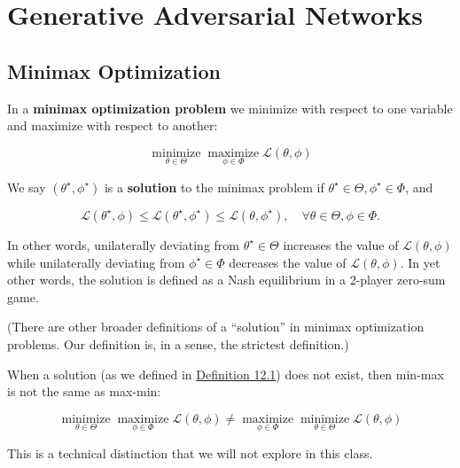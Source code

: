 \chapter{Generative Adversarial Networks}

\section{Minimax Optimization}

\begin{definition}
    In a \textbf{minimax optimization problem} we minimize with respect to one variable and maximize with respect to another:

    $$
    \underset{\theta \in \Theta}{\operatorname{minimize}} \underset{\phi \in \Phi}{\operatorname{maximize}} \mathcal{L}(\theta, \phi)
    $$

    We say $\left(\theta^{\star}, \phi^{\star}\right)$ is a \textbf{solution} to the minimax problem if $\theta^{\star} \in \Theta, \phi^{\star} \in \Phi$, and

    $$
    \mathcal{L}\left(\theta^{\star}, \phi\right) \leq \mathcal{L}\left(\theta^{\star}, \phi^{\star}\right) \leq \mathcal{L}\left(\theta, \phi^{\star}\right), \quad \forall \theta \in \Theta, \phi \in \Phi .
    $$

    In other words, unilaterally deviating from $\theta^{\star} \in \Theta$ increases the value of $\mathcal{L}(\theta, \phi)$ while unilaterally deviating from $\phi^{\star} \in \Phi$ decreases the value of $\mathcal{L}(\theta, \phi)$. In yet other words, the solution is defined as a Nash equilibrium in a 2-player zero-sum game.

    (There are other broader definitions of a “solution” in minimax optimization problems. Our definition is, in a sense, the strictest definition.)
\end{definition}

\begin{concept}
    When a solution (as we defined in \hyperref[definition:12.1]{Definition 12.1}) does not exist, then min-max is not the same as max-min:

    $$
    \underset{\theta \in \Theta}{\operatorname{minimize}} \underset{\phi \in \Phi}{\operatorname{maximize}} \mathcal{L}(\theta, \phi) \neq \underset{\phi \in \Phi}{\operatorname{maximize}} \underset{\theta \in \Theta}{\operatorname{minimize}} \mathcal{L}(\theta, \phi)
    $$

    This is a technical distinction that we will not explore in this class.
\end{concept}

